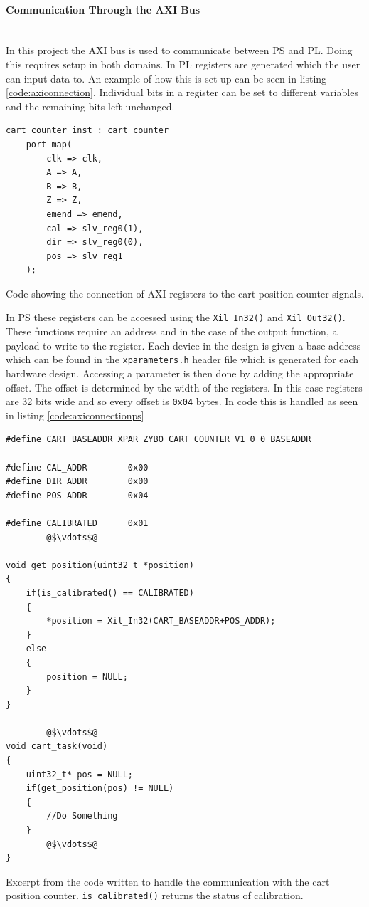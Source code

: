 \paragraph{Communication Through the AXI Bus}~\\ %
\label{par:communication_through_the_axi_bus}
In this project the AXI bus is used to communicate between PS and PL.
Doing this requires setup in both domains.
In PL registers are generated which the user can input data to.
An example of how this is set up can be seen in listing \ref{code:axiconnection}.
Individual bits in a register can be set to different variables and the remaining bits left unchanged.

\begin{listing}[h]
\begin{verbatim}
cart_counter_inst : cart_counter
	port map(
	    clk => clk,
	    A => A,
	    B => B,
	    Z => Z,
	    emend => emend,
	    cal => slv_reg0(1),
	    dir => slv_reg0(0),
	    pos => slv_reg1
	);
\end{verbatim}
\caption{Code showing the connection of AXI registers to the cart position counter signals.}
\label{code:axiconnection}
\end{listing}

In PS these registers can be accessed using the \texttt{Xil\_In32()} and \texttt{Xil\_Out32()}.
These functions require an address and in the case of the output function, a payload to write to the register.
Each device in the design is given a base address which can be found in the \texttt{xparameters.h} header file which is generated for each hardware design.
Accessing a parameter is then done by adding the appropriate offset.
The offset is determined by the width of the registers.
In this case registers are 32 bits wide and so every offset is \texttt{0x04} bytes.
In code this is handled as seen in listing \ref{code:axiconnectionps}

\begin{listing}[h]
\begin{verbatim}
#define CART_BASEADDR XPAR_ZYBO_CART_COUNTER_V1_0_0_BASEADDR

#define CAL_ADDR		0x00
#define DIR_ADDR		0x00
#define POS_ADDR		0x04
	
#define CALIBRATED		0x01
		@$\vdots$@
	
void get_position(uint32_t *position)
{
	if(is_calibrated() == CALIBRATED)
	{
		*position = Xil_In32(CART_BASEADDR+POS_ADDR);
	}
	else
	{
		position = NULL;
	}
}

		@$\vdots$@
void cart_task(void)
{
	uint32_t* pos = NULL;
	if(get_position(pos) != NULL)
	{
		//Do Something
	}
		@$\vdots$@
}
\end{verbatim}
\caption[Excerpt from the code written to handle the communication with the cart position counter.]{Excerpt from the code written to handle the communication with the cart position counter. \texttt{is\_calibrated()} returns the status of calibration.}
\label{code:axiconnectionps}
\end{listing}

